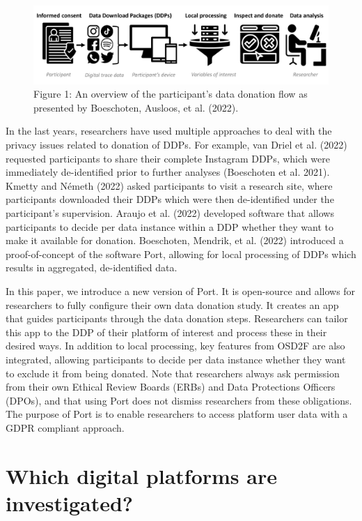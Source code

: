\documentclass[
]{article}
\begin{document}
\begin{figure}
\centering
\includegraphics{data_donation_flow.pdf}
\caption{Figure 1: An overview of the participant's data donation flow
as presented by Boeschoten, Ausloos, et al. (2022).\label{fig:workflow}}
\end{figure}

In the last years, researchers have used multiple approaches to deal
with the privacy issues related to donation of DDPs. For example, van
Driel et al. (2022) requested participants to share their complete
Instagram DDPs, which were immediately de-identified prior to further
analyses (Boeschoten et al. 2021). Kmetty and Németh (2022) asked
participants to visit a research site, where participants downloaded
their DDPs which were then de-identified under the participant's
supervision. Araujo et al. (2022) developed software that allows
participants to decide per data instance within a DDP whether they want
to make it available for donation. Boeschoten, Mendrik, et al. (2022)
introduced a proof-of-concept of the software Port, allowing for local
processing of DDPs which results in aggregated, de-identified data.

In this paper, we introduce a new version of Port. It is open-source and
allows for researchers to fully configure their own data donation study.
It creates an app that guides participants through the data donation
steps. Researchers can tailor this app to the DDP of their platform of
interest and process these in their desired ways. In addition to local
processing, key features from OSD2F are also integrated, allowing
participants to decide per data instance whether they want to exclude it
from being donated. Note that researchers always ask permission from
their own Ethical Review Boards (ERBs) and Data Protections Officers
(DPOs), and that using Port does not dismiss researchers from these
obligations. The purpose of Port is to enable researchers to access
platform user data with a GDPR compliant approach.

\hypertarget{which-digital-platforms-are-investigated}{%
\section{Which digital platforms are
investigated?}\label{which-digital-platforms-are-investigated}}
\end{document}
